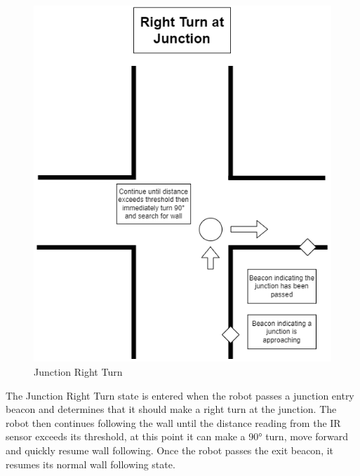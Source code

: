 \documentclass[12pt]{report}
\begin{document}
\begin{figure}[H]
\caption{Junction Right Turn}
\centering
\includegraphics[scale=0.6]{images/Junction Diagrams Right Turn.png}
\centering
\end{figure}

The Junction Right Turn state is entered when the robot passes a junction entry beacon and determines that it should make a right turn at the junction. The robot then continues following the wall until the distance reading from the IR sensor exceeds its threshold, at this point it can make a 90° turn, move forward and quickly resume wall following. Once the robot passes the exit beacon, it resumes its normal wall following state.
\end{document}
